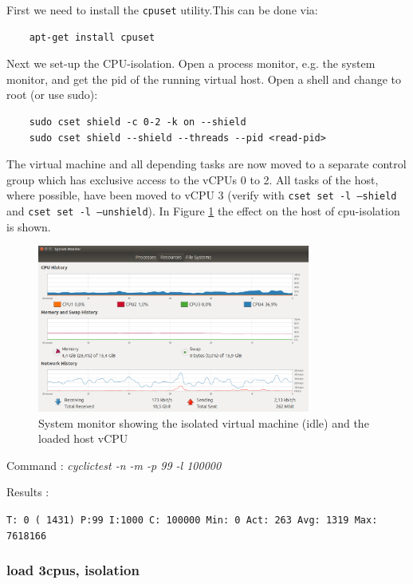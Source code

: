 \documentclass[]{scrartcl}
\begin{document}
First we need to install the \texttt{cpuset} utility.This can be done via:

\begin{verbatim}
	apt-get install cpuset
\end{verbatim}

Next we set-up the CPU-isolation. Open a process monitor, e.g. the system monitor, and get the pid of the running virtual host. Open a shell and change to root (or use sudo):

\begin{verbatim}
	sudo cset shield -c 0-2 -k on --shield
	sudo cset shield --shield --threads --pid <read-pid>
\end{verbatim}

The virtual machine and all depending tasks are now moved to a separate control group which has exclusive access to the vCPUs 0 to 2. All tasks of the host, where possible, have been moved to vCPU 3 (verify with \texttt{cset set -l --shield} and \texttt{cset set -l --unshield}). In Figure \ref{fig:test-cpu} the effect on the host of cpu-isolation is shown.

\begin{figure}[t]
	\centering
	\includegraphics[width=0.8\textwidth]{test-cpu}
	\caption{System monitor showing the isolated virtual machine (idle) and the loaded host vCPU}
	\label{fig:test-cpu}
\end{figure}


\noindent Command : \textit{cyclictest -n -m -p 99 -l 100000}

\noindent Results :

\noindent \texttt{T: 0 ( 1431) P:99 I:1000 C: 100000 Min:      0 Act:  263 Avg: 1319 Max:  7618166}

\subsubsection{load 3cpus, isolation}
\end{document}
